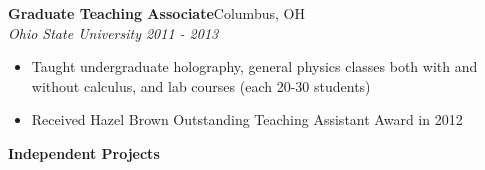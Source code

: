 \documentclass[line]{letter}
\begin{document}
{\large {\bf Graduate Teaching Associate}\hfill Columbus, OH\vspace{1mm}}\\
{\large \it Ohio State University \hfill 2011 - 2013} \\
\vspace{-5mm}
\begin{itemize}
\item Taught undergraduate holography, general physics classes both with and without calculus, and lab courses (each 20-30 students)
\item Received Hazel Brown Outstanding Teaching Assistant Award in 2012
\end{itemize}

{\large {\bf Independent Projects}}\\
\vspace{-5mm}



\end{document}
